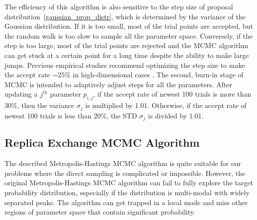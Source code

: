 \documentclass[preprint2]{aastex}
\begin{document}
The efficiency of this algorithm is also sensitive to the step size of proposal distribution~\eqref{gaussian_prop_distr}, which is determined by the variance of the Gaussian distribution. If it is too small, most of the trial points are accepted, but the random walk is too slow to sample all the parameter space. Conversely, if the step is too large, most of the trial points are rejected and the MCMC algorithm can get stuck at a certain point for a long time despite the ability to make large jumps. Previous empirical studies recommend optimizing the step size to make the accept rate $\sim 25$\% in high-dimensional cases \citep[see references in][]{Gregory2005}. The second, burn-in stage of MCMC is intended to adaptively adjust steps for all the parameters. After updating a $j^{th}$ parameter $p_{i,j}$, if the accept rate of newest 100 trials is more than 30\%, then the variance $\sigma_j$ is multiplied by 1.01. Otherwise, if the accept rate of newest 100 trials is less than 20\%, the STD $\sigma_j$ is divided by 1.01. 



\subsection{Replica Exchange MCMC Algorithm}

The described Metropolis-Hastings MCMC algorithm is quite suitable for our problems where the direct sampling is complicated or impossible. However, the original Metropolis-Hastings MCMC algorithm can fail to fully explore the target probability distribution, especially if the distribution is multi-modal with widely separated peaks. The algorithm can get trapped in a local mode and miss other regions of parameter space that contain significant probability. 
\end{document}
